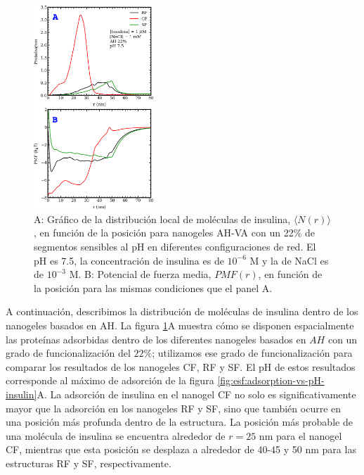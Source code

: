 \begin{figure}[!htb]
    \centering
    \includegraphics[width=0.40\textwidth]{Figures/graphs-gel2/insu-ads-pmf.pdf}
    \caption{A: Gr\'afico de la distribuci\'on local de mol\'eculas de insulina, $\langle N(r) \rangle$, en funci\'on de la posici\'on para nanogeles AH-VA con un 22\% de segmentos sensibles al pH en diferentes configuraciones de red.
    	El pH es 7.5, la concentraci\'on de insulina es de $10^{-6}$ M y la de NaCl es de $10^{-3}$ M.
    	B: Potencial de fuerza media, ${PMF}(r)$, en funci\'on de la posici\'on para las mismas condiciones que el panel A.}
    \label{fig:esf:adsorption-vs-r-insulin}
\end{figure}



A continuaci\'on, describimos la distribuci\'on de mol\'eculas de insulina dentro de los nanogeles basados en AH.
La figura \ref{fig:esf:adsorption-vs-r-insulin}A muestra c\'omo se disponen espacialmente las prote\'inas adsorbidas dentro de los diferentes nanogeles basados en $AH$ con un grado de funcionalizaci\'on del $22\%$;
utilizamos ese grado de funcionalizaci\'on para comparar los resultados de los nanogeles CF, RF y SF.
El pH de estos resultados corresponde al m\'aximo de adsorci\'on de la figura \ref{fig:esf:adsorption-vs-pH-insulin}A.
La adsorci\'on de insulina en el nanogel CF no solo es significativamente mayor que la adsorci\'on en los nanogeles RF y SF, sino que tambi\'en ocurre en una posici\'on m\'as profunda dentro de la estructura.
La posici\'on m\'as probable de una mol\'ecula de insulina se encuentra alrededor de $r=25$ nm para el nanogel CF,
mientras que esta posici\'on se desplaza a alrededor de 40-45 y 50 nm para las estructuras RF y SF, respectivamente.

